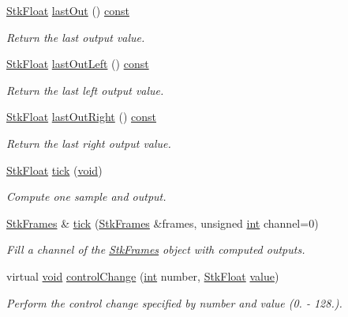\begin{DoxyCompactItemize}
\hyperlink{namespace_nyq_a044fa20a706520a617bbbf458a7db7e4}{Stk\+Float} \hyperlink{class_nyq_1_1_instrmnt_a7d46c2f8bfd2aa3f97dea909853cbd67}{last\+Out} () \hyperlink{getopt1_8c_a2c212835823e3c54a8ab6d95c652660e}{const} 
\begin{DoxyCompactList}\small\item\em Return the last output value. \end{DoxyCompactList}\item 
\hyperlink{namespace_nyq_a044fa20a706520a617bbbf458a7db7e4}{Stk\+Float} \hyperlink{class_nyq_1_1_instrmnt_a70a4fa6080b836b34690cc15abffa2e0}{last\+Out\+Left} () \hyperlink{getopt1_8c_a2c212835823e3c54a8ab6d95c652660e}{const} 
\begin{DoxyCompactList}\small\item\em Return the last left output value. \end{DoxyCompactList}\item 
\hyperlink{namespace_nyq_a044fa20a706520a617bbbf458a7db7e4}{Stk\+Float} \hyperlink{class_nyq_1_1_instrmnt_ab6253dc27031f98bf7e1c4af6f99b0b9}{last\+Out\+Right} () \hyperlink{getopt1_8c_a2c212835823e3c54a8ab6d95c652660e}{const} 
\begin{DoxyCompactList}\small\item\em Return the last right output value. \end{DoxyCompactList}\item 
\hyperlink{namespace_nyq_a044fa20a706520a617bbbf458a7db7e4}{Stk\+Float} \hyperlink{class_nyq_1_1_instrmnt_a9f774ea648767c7f00c3acf9d1cd4c33}{tick} (\hyperlink{sound_8c_ae35f5844602719cf66324f4de2a658b3}{void})
\begin{DoxyCompactList}\small\item\em Compute one sample and output. \end{DoxyCompactList}\item 
\hyperlink{class_nyq_1_1_stk_frames}{Stk\+Frames} \& \hyperlink{class_nyq_1_1_instrmnt_a9098b45b45fdc4733e1f201b206692a7}{tick} (\hyperlink{class_nyq_1_1_stk_frames}{Stk\+Frames} \&frames, unsigned \hyperlink{xmltok_8h_a5a0d4a5641ce434f1d23533f2b2e6653}{int} channel=0)
\begin{DoxyCompactList}\small\item\em Fill a channel of the \hyperlink{class_nyq_1_1_stk_frames}{Stk\+Frames} object with computed outputs. \end{DoxyCompactList}\item 
virtual \hyperlink{sound_8c_ae35f5844602719cf66324f4de2a658b3}{void} \hyperlink{class_nyq_1_1_instrmnt_a2f51ff6781de58c7af00608609a82704}{control\+Change} (\hyperlink{xmltok_8h_a5a0d4a5641ce434f1d23533f2b2e6653}{int} number, \hyperlink{namespace_nyq_a044fa20a706520a617bbbf458a7db7e4}{Stk\+Float} \hyperlink{lib_2expat_8h_a4a30a13b813682e68c5b689b45c65971}{value})
\begin{DoxyCompactList}\small\item\em Perform the control change specified by {\itshape number} and {\itshape value} (0. -\/ 128.). \end{DoxyCompactList}\end{DoxyCompactItemize}

